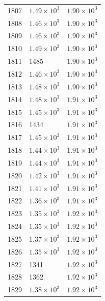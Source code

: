 \begin{table}[H]
\begin{tabular}{lll}
1807 & $\displaystyle 1.49 \times 10^{3}$ & $\displaystyle 1.90 \times 10^{3}$ \\
1808 & $\displaystyle 1.46 \times 10^{3}$ & $\displaystyle 1.90 \times 10^{3}$ \\
1809 & $\displaystyle 1.46 \times 10^{3}$ & $\displaystyle 1.90 \times 10^{3}$ \\
1810 & $\displaystyle 1.49 \times 10^{3}$ & $\displaystyle 1.90 \times 10^{3}$ \\
1811 & 1485 & $\displaystyle 1.90 \times 10^{3}$ \\
1812 & $\displaystyle 1.46 \times 10^{3}$ & $\displaystyle 1.90 \times 10^{3}$ \\
1813 & $\displaystyle 1.48 \times 10^{3}$ & $\displaystyle 1.90 \times 10^{3}$ \\
1814 & $\displaystyle 1.48 \times 10^{3}$ & $\displaystyle 1.91 \times 10^{3}$ \\
1815 & $\displaystyle 1.45 \times 10^{3}$ & $\displaystyle 1.91 \times 10^{3}$ \\
1816 & 1434 & $\displaystyle 1.91 \times 10^{3}$ \\
1817 & $\displaystyle 1.45 \times 10^{3}$ & $\displaystyle 1.91 \times 10^{3}$ \\
1818 & $\displaystyle 1.44 \times 10^{3}$ & $\displaystyle 1.91 \times 10^{3}$ \\
1819 & $\displaystyle 1.44 \times 10^{3}$ & $\displaystyle 1.91 \times 10^{3}$ \\
1820 & $\displaystyle 1.42 \times 10^{3}$ & $\displaystyle 1.91 \times 10^{3}$ \\
1821 & $\displaystyle 1.41 \times 10^{3}$ & $\displaystyle 1.91 \times 10^{3}$ \\
1822 & $\displaystyle 1.36 \times 10^{3}$ & $\displaystyle 1.91 \times 10^{3}$ \\
1823 & $\displaystyle 1.35 \times 10^{3}$ & $\displaystyle 1.92 \times 10^{3}$ \\
1824 & $\displaystyle 1.35 \times 10^{3}$ & $\displaystyle 1.92 \times 10^{3}$ \\
1825 & $\displaystyle 1.37 \times 10^{3}$ & $\displaystyle 1.92 \times 10^{3}$ \\
1826 & $\displaystyle 1.35 \times 10^{3}$ & $\displaystyle 1.92 \times 10^{3}$ \\
1827 & 1341 & $\displaystyle 1.92 \times 10^{3}$ \\
1828 & 1362 & $\displaystyle 1.92 \times 10^{3}$ \\
1829 & $\displaystyle 1.38 \times 10^{3}$ & $\displaystyle 1.92 \times 10^{3}$ \\

\end{tabular}
\end{table}
